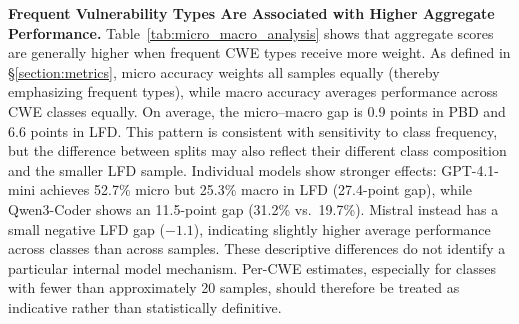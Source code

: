 \documentclass[lettersize,journal]{IEEEtran}
\begin{document}
\textbf{Frequent Vulnerability Types Are Associated with Higher Aggregate Performance.} Table~\ref{tab:micro_macro_analysis} shows that aggregate scores are generally higher when frequent \gls{CWE} types receive more weight. As defined in \S\ref{section:metrics}, micro accuracy weights all samples equally (thereby emphasizing frequent types), while macro accuracy averages performance across \gls{CWE} classes equally. On average, the micro--macro gap is 0.9 points in PBD and 6.6 points in LFD. This pattern is consistent with sensitivity to class frequency, but the difference between splits may also reflect their different class composition and the smaller LFD sample. Individual models show stronger effects: GPT-4.1-mini achieves 52.7\% micro but 25.3\% macro in LFD (27.4-point gap), while Qwen3-Coder shows an 11.5-point gap (31.2\% vs.\ 19.7\%). Mistral instead has a small negative LFD gap ($-1.1$), indicating slightly higher average performance across classes than across samples. These descriptive differences do not identify a particular internal model mechanism. Per-CWE estimates, especially for classes with fewer than approximately 20 samples, should therefore be treated as indicative rather than statistically definitive.
\end{document}
